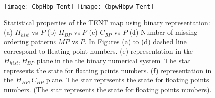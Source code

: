 \begin{figure}
	\texttt{[image: CbpHbp\_Tent]}
	\texttt{[image: CbpwHbpw\_Tent]}
	\caption{Statistical properties of the TENT map using binary representation: (a) $H_{hist}$ vs $P$ (b) $H_{BP}$ vs $P$ (c) $C_{BP}$ vs $P$ (d) Number of missing ordering patterns $MP$ vs $P$. In Figures (a) to (d) dashed line correspond to floating point numbers. (e) representation in the $H_{hist},H_{BP}$ plane in the the binary numerical system.  The star represents the state for floating points numbers. (f) representation in the $H_{BP},C_{BP}$ plane.  The star represents the state for floating points numbers. (The star represents the state for floating points numbers). } \label{fig:TENT_HC}
\end{figure}
